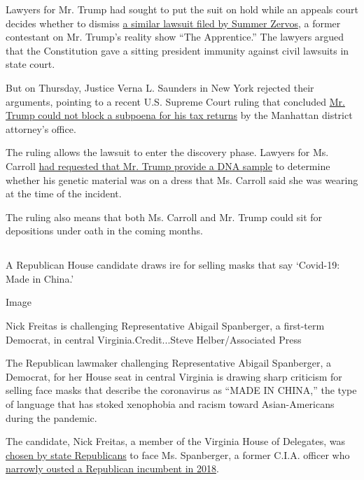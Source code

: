 Lawyers for Mr. Trump had sought to put the suit on hold while an
appeals court decides whether to dismiss
\href{https://www.nytimes3xbfgragh.onion/2017/01/17/us/former-apprentice-contestant-files-defamation-suit-against-trump.html}{a
similar lawsuit filed by Summer Zervos}, a former contestant on Mr.
Trump's reality show ``The Apprentice.'' The lawyers argued that the
Constitution gave a sitting president immunity against civil lawsuits in
state court.

But on Thursday, Justice Verna L. Saunders in New York rejected their
arguments, pointing to a recent U.S. Supreme Court ruling that concluded
\href{https://www.nytimes3xbfgragh.onion/2020/07/09/us/trump-taxes-supreme-court.html}{Mr.
Trump could not block a subpoena for his tax returns} by the Manhattan
district attorney's office.

The ruling allows the lawsuit to enter the discovery phase. Lawyers for
Ms. Carroll
\href{https://www.nytimes3xbfgragh.onion/2020/01/30/nyregion/e-jean-carroll-trump-dna.html}{had
requested that Mr. Trump provide a DNA sample} to determine whether his
genetic material was on a dress that Ms. Carroll said she was wearing at
the time of the incident.

The ruling also means that both Ms. Carroll and Mr. Trump could sit for
depositions under oath in the coming months.

\hypertarget{section-11}{%
\subsection{}\label{section-11}}

A Republican House candidate draws ire for selling masks that say
`Covid-19: Made in China.'

Image

Nick Freitas is challenging Representative Abigail Spanberger, a
first-term Democrat, in central Virginia.Credit...Steve
Helber/Associated Press

The Republican lawmaker challenging Representative Abigail Spanberger, a
Democrat, for her House seat in central Virginia is drawing sharp
criticism for selling face masks that describe the coronavirus as ``MADE
IN CHINA,'' the type of language that has stoked xenophobia and racism
toward Asian-Americans during the pandemic.

The candidate, Nick Freitas, a member of the Virginia House of
Delegates, was
\href{https://apnews.com/eacdfb20e3c9f7464e7dae6e98c38d9e}{chosen by
state Republicans} to face Ms. Spanberger, a former C.I.A. officer who
\href{https://www.nytimes3xbfgragh.onion/elections/results/virginia-house-district-7}{narrowly
ousted a Republican incumbent in 2018}.

